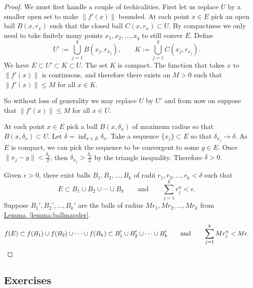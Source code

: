 \documentclass[12pt]{book}
\newcommand{\snorm}[1]{\lVert {#1} \rVert}
\newcommand{\R}{{\mathbb{R}}}
\theoremstyle{plain}
\theoremstyle{remark}
\theoremstyle{definition}
\theoremstyle{exercise}
\theoremstyle{example}
\newtheorem{example}[thm]{Example}
\newcommand{\lemmaref}[1]{\hyperref[#1]{Lemma~\ref*{#1}}}
\begin{document}
\begin{proof}
We must first handle a couple of techicalities.  First let us replace $U$
by a smaller open set to make $\snorm{f'(x)}$ bounded.  At each point $x \in
E$ pick an open ball $B(x,r_x)$ such that the closed ball $C(x,r_x) \subset
U$.  By compactness we only need to take finitely
many points $x_1,x_2,\ldots,x_q$ to still conver $E$.  Define
\begin{equation}
U' := \bigcup_{j=1}^q B(x_j,r_{x_j}), \qquad
K := \bigcup_{j=1}^q C(x_j,r_{x_j}).
\end{equation}
We have $E \subset U' \subset K \subset U$.  The set $K$ is compact.
The function that takes $x$ to $\snorm{f'(x)}$ is continuous, and therefore
there exists an $M > 0$ such that $\snorm{f'(x)} \leq M$ for all $x \in K$.

So without loss of generality we may replace $U$ by $U'$ and from now on
suppose that $\snorm{f'(x)} \leq M$ for all $x \in U$.

At each point $x \in E$ pick a ball $B(x,\delta_x)$ of maximum radius 
so that $B(x,\delta_x) \subset U$.  Let $\delta = \inf_{x\in E} \delta_x$.
Take a sequence $\{ x_j \} \subset E$ so that $\delta_{x_j} \to \delta$.
As $E$ is compact, we can pick the sequence to be convergent to some $y \in
E$.  Once $\snorm{x_j-y} < \frac{\delta_y}{2}$, then
$\delta_{x_j} > \frac{\delta_y}{2}$ by the triangle inequality.
Therefore $\delta > 0$.

Given $\epsilon > 0$, there exist balls $B_1,B_2,\ldots,B_k$ of radii
$r_1,r_2,\ldots,r_k < \delta$ such that
\begin{equation*}
E \subset B_1 \cup B_2 \cup \cdots \cup B_k
\qquad \text{and} \qquad
\sum_{j=1}^k r_j^n < \epsilon.
\end{equation*}
Suppose $B_1', B_2', \ldots, B_k'$ are the balls of radius
$Mr_1, Mr_2, \ldots, Mr_k$ from
\lemmaref{lemma:ballmapder}.
\begin{equation*}
f(E) \subset f(B_1) \cup f(B_2) \cup \cdots \cup f(B_k)
\subset B_1' \cup B_2' \cup \cdots \cup B_k'
\qquad \text{and} \qquad
\sum_{j=1}^k Mr_j^n
 < M \epsilon. \qedhere
\end{equation*}
\end{proof}

%
%

\subsection{Exercises}
\end{document}
